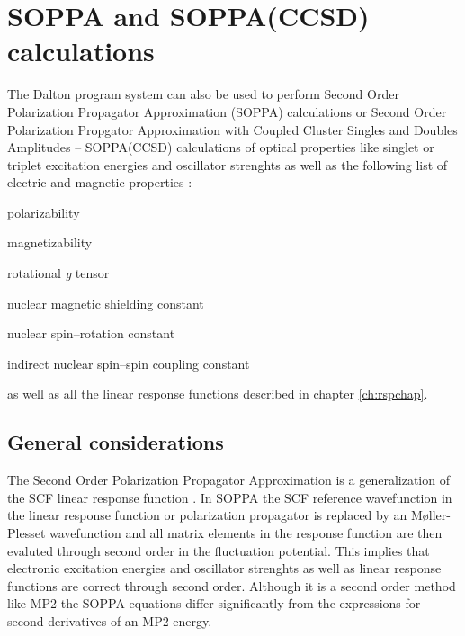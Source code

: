 \chapter{SOPPA and SOPPA(CCSD) calculations}\label{ch:soppa}

The Dalton program system can also be used to perform Second Order
Polarization Propagator Approximation (SOPPA) 
 calculations
\cite{esnpjjodjcp73,mjpekdtehjajjojcp,spascpl260,tejospastcan100} or Second
Order Polarization Propgator Approximation with Coupled Cluster Singles and
Doubles Amplitudes -- SOPPA(CCSD)  calculations of optical
properties like singlet or triplet excitation energies and oscillator strenghts as well as the
following list of electric and magnetic properties :
\begin{center}
\begin{list}{}{}
\item polarizability
\item magnetizability
\item rotational {\em g} tensor
\item nuclear magnetic shielding constant
\item nuclear spin--rotation constant
\item indirect nuclear spin--spin coupling constant
\end{list}
\end{center}
as well as all the linear response functions described in chapter
\ref{ch:rspchap}.


\section{General considerations}\label{sec:soppageneral}

The Second Order Polarization Propagator Approximation is a generalization of
the SCF linear response function
\cite{esnpjjodjcp73,jopjdycpr2,mjpekdtehjajjojcp}. In SOPPA the SCF reference
wavefunction in the linear response function or polarization propagator is
replaced by an M{\o}ller-Plesset wavefunction and all matrix elements in the
response function are then evaluted through second order in the fluctuation
potential. This implies that electronic excitation energies and oscillator
strenghts as well as linear response functions are correct through second
order. Although it is a second order method like MP2 the SOPPA equations
differ significantly from the expressions for second derivatives of an MP2
energy. 

